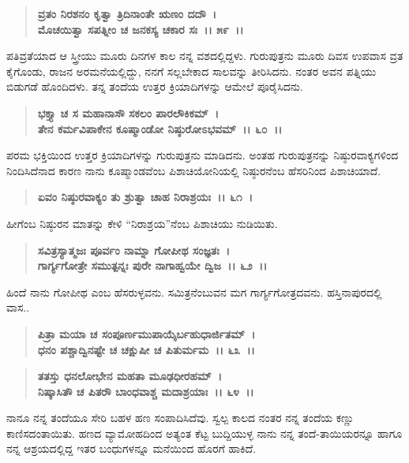\begin{verse}
\textbf{ವ್ರತಂ ನಿರಶನಂ ಕೃತ್ವಾ ತ್ರಿದಿನಾಂತೇ ಋಣಂ ದದೌ~।}\\\textbf{ಮೊಚಯಿತ್ವಾ ಸಪತ್ನೀಂ ಚ ಜನಕಸ್ಯ ಚಕಾರ ಸಃ~।। ೫೯~।।}
\end{verse}

ಪತಿವ್ರತೆಯಾದ ಆ ಸ್ತ್ರೀಯು ಮೂರು ದಿನಗಳ ಕಾಲ ನನ್ನ ವಶದಲ್ಲಿದ್ದಳು. ಗುರುಪುತ್ರನು ಮೂರು ದಿವಸ ಉಪವಾಸ ವ್ರತ ಕೈಗೊಂಡು, ರಾಜನ ಅರಮನೆಯಲ್ಲಿದ್ದು, ನನಗೆ ಸಲ್ಲಬೇಕಾದ ಸಾಲವನ್ನು ತೀರಿಸಿದನು. ನಂತರ ಅವನ ಪತ್ನಿಯು ಬಿಡುಗಡೆ ಹೊಂದಿದಳು. ತನ್ನ ತಂದೆಯ ಉತ್ತರ ಕ್ರಿಯಾದಿಗಳನ್ನು ಆಮೇಲೆ ಪೂರೈಸಿದನು.

\begin{verse}
\textbf{ಭಕ್ತ್ಯಾ ಚ ಸ ಮಹಾನಾಸೌ ಸಕಲಂ ಪಾರಲೌಕಿಕಮ್~।}\\\textbf{ತೇನ ಕರ್ಮವಿಪಾಕೇನ ಕೂಷ್ಮಾಂಡೋ ನಿಷ್ಠುರೋಽಭವಮ್~।। ೬೦~।।}
\end{verse}

ಪರಮ ಭಕ್ತಿಯಿಂದ ಉತ್ತರ ಕ್ರಿಯಾದಿಗಳನ್ನು ಗುರುಪುತ್ರನು ಮಾಡಿದನು. ಅಂತಹ ಗುರುಪುತ್ರನನ್ನು ನಿಷ್ಠುರವಾಕ್ಯಗಳಿಂದ ನಿಂದಿಸಿದೆನಾದ ಕಾರಣ ನಾನು ಕೂಷ್ಮಾಂಡವೆಂಬ ಪಿಶಾಚಿಯೋನಿಯಲ್ಲಿ ನಿಷ್ಠುರನೆಂಬ ಹೆಸರಿನಿಂದ ಪಿಶಾಚಿಯಾದೆ.

\begin{verse}
\textbf{ಏವಂ ನಿಷ್ಠುರವಾಕ್ಯಂ ತು ಶ್ರುತ್ವಾ ಚಾಹ ನಿರಾಶ್ರಯಃ~।। ೬೧~।}
\end{verse}

ಹೀಗೆಂಬ ನಿಷ್ಠುರನ ಮಾತನ್ನು ಕೇಳಿ “ನಿರಾಶ್ರಯ”ನೆಂಬ ಪಿಶಾಚಿಯು ನುಡಿಯಿತು.

\begin{verse}
\textbf{ಸವಿತ್ರಸ್ಯಾತ್ಮಜಃ ಪೂರ್ವಂ ನಾಮ್ನಾ ಗೋಪೀಥ ಸಂಜ್ಞತಃ~।}\\\textbf{ಗಾರ್ಗ್ಯಗೋತ್ರೇ ಸಮುತ್ಪನ್ನಃ ಪುರೇ ನಾಗಾಹ್ವಯೇ ದ್ವಿಜ~।। ೬೨~।।}
\end{verse}

ಹಿಂದೆ ನಾನು ಗೋಪೀಥ ಎಂಬ ಹೆಸರುಳ್ಳವನು. ಸಮಿತ್ರನೆಂಬುವನ ಮಗ ಗಾರ್ಗ್ಯಗೋತ್ರದವನು. ಹಸ್ತಿನಾಪುರದಲ್ಲಿ ವಾಸ..

\begin{verse}
\textbf{ಪಿತ್ರಾ ಮಯಾ ಚ ಸಂಪೂರ್ಣಮುಪಾಯೈರ್ಬಹುಧಾರ್ಜಿತಮ್~।}\\\textbf{ಧನಂ ಪಶ್ಚಾದ್ವಿನಷ್ಟೇ ಚ ಚಕ್ಷುಷೀ ಚ ಪಿತುರ್ಮಮ~।। ೬೩~।।}
\end{verse}

\begin{verse}
\textbf{ತತಸ್ತು ಧನಲೋಭೇನ ಮಹತಾ ಮೂಢಧೀರಹಮ್~।}\\\textbf{ನಿಷ್ಕಾಸಿತೌ ಚ ಪಿತರೌ‌ ಬಾಂಧವಾಶ್ಚ ಮದಾಶ್ರಯಾಃ~।। ೬೪~।।}
\end{verse}

ನಾನೂ ನನ್ನ ತಂದೆಯೂ ಸೇರಿ ಬಹಳ ಹಣ ಸಂಪಾದಿಸಿದೆವು. ಸ್ವಲ್ಪ ಕಾಲದ ನಂತರ ನನ್ನ ತಂದೆಯ ಕಣ್ಣು ಕಾಣಿಸದಂತಾಯಿತು. ಹಣದ ವ್ಯಾಮೋಹದಿಂದ ಅತ್ಯಂತ ಕೆಟ್ಟ ಬುದ್ದಿಯುಳ್ಳ ನಾನು ನನ್ನ ತಂದೆ-ತಾಯಿಯರನ್ನೂ ಹಾಗೂ ನನ್ನ ಆಶ್ರಯದಲ್ಲಿದ್ದ ಇತರ ಬಂಧುಗಳನ್ನೂ ಮನೆಯಿಂದ ಹೊರಗೆ ಹಾಕಿದೆ.

